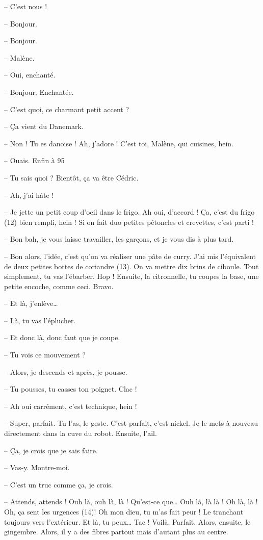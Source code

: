 \documentclass[11pt, french]{report}
\begin{document}
-- C’est nous !

-- Bonjour.

-- Bonjour.

-- Malène.

-- Oui, enchanté.

-- Bonjour. Enchantée.

-- C’est quoi, ce charmant petit accent ?

-- Ça vient du Danemark.

-- Non ! Tu es danoise ! Ah, j’adore ! C’est toi, Malène, qui cuisines, hein.

-- Ouais. Enfin à 95 %

-- Tu sais quoi ? Bientôt, ça va être Cédric.

-- Ah, j’ai hâte !

-- Je jette un petit coup d’oeil dans le frigo. Ah oui, d’accord ! Ça, c’est
du frigo (12) bien rempli, hein ! Si on fait duo petites pétoncles et crevettes,
c’est parti !

-- Bon bah, je vous laisse travailler, les garçons, et je vous dis à plus tard.

-- Bon alors, l’idée, c’est qu’on va réaliser une pâte de curry. J’ai mis
l’équivalent de deux petites bottes de coriandre (13). On va mettre dix brins
de ciboule. Tout simplement, tu vas l’ébarber. Hop ! Ensuite, la citronnelle,
tu coupes la base, une petite encoche, comme ceci. Bravo.

-- Et là, j’enlève…

-- Là, tu vas l’éplucher.

-- Et donc là, donc faut que je coupe.

-- Tu vois ce mouvement ?

-- Alors, je descends et après, je pousse.

-- Tu pousses, tu casses ton poignet. Clac !

-- Ah oui carrément, c’est technique, hein !

-- Super, parfait. Tu l’as, le geste. C’est parfait, c’est nickel. Je le mets
à nouveau directement dans la cuve du robot. Ensuite, l’ail.

-- Ça, je crois que je sais faire.

-- Vas-y. Montre-moi.

-- C’est un truc comme ça, je crois.

-- Attends, attends ! Ouh là, ouh là, là ! Qu’est-ce que… Ouh là, là là !
Oh là, là ! Oh, ça sent les urgences (14)! Oh mon dieu, tu m’as fait peur !
Le tranchant toujours vers l’extérieur. Et là, tu peux… Tac ! Voilà. Parfait.
Alors, ensuite, le gingembre. Alors, il y a des fibres partout mais d’autant
plus au centre.
\end{document}
